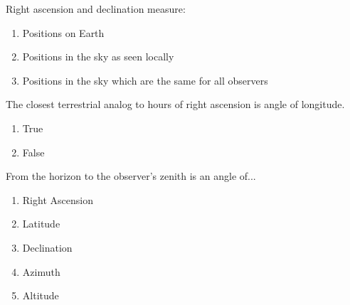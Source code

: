 \documentclass[11pt]{article}
\begin{document}
\begin{enumerate}
\begin{minipage}{\textwidth}
\begin{minipage}{\textwidth}
\end{minipage}
\end{minipage}
\vskip 0.20in

\begin{minipage}{\textwidth}
\begin{minipage}{\textwidth}
\item Right ascension and declination measure:
\begin{enumerate} 
\setlength{\itemsep}{1pt} 
\setlength{\parskip}{0pt} 
\setlength{\parsep}{0pt}
\setlength{\multicolsep}{1pt} 
\item Positions on Earth
\item Positions in the sky as seen locally
\item Positions in the sky which are the same for all observers
\end{enumerate} 
\end{minipage}
\end{minipage}
\vskip 0.20in

\begin{minipage}{\textwidth}
\begin{minipage}{\textwidth}
\item The closest terrestrial analog to hours of right ascension is angle of longitude.
\begin{multicols}{3}
\begin{enumerate} 
\setlength{\itemsep}{1pt} 
\setlength{\parskip}{0pt} 
\setlength{\parsep}{0pt}
\setlength{\multicolsep}{1pt} 
\item True
\item False
\end{enumerate} 
\vfill 
\end{multicols}

\end{minipage}
\end{minipage}
\vskip 0.20in

\begin{minipage}{\textwidth}
\begin{minipage}{\textwidth}
\item From the horizon to the observer's zenith is an angle of...
\begin{multicols}{3}
\begin{enumerate} 
\setlength{\itemsep}{1pt} 
\setlength{\parskip}{0pt} 
\setlength{\parsep}{0pt}
\setlength{\multicolsep}{1pt} 
\item Right Ascension
\item Latitude
\item Declination
\item Azimuth
\item Altitude
\end{enumerate} 
\vfill 
\end{multicols}


\end{minipage}
\end{minipage}
\end{enumerate}
\end{document}

